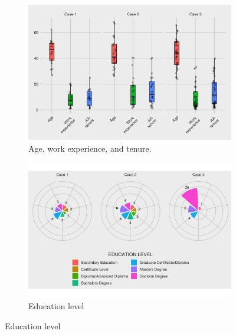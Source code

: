 \begin{figure}
\centering
\begin{subfigure}[b]{0.7\textwidth}
\includegraphics[width=1\linewidth]{Images/age_demographics.png}
\caption{Age, work experience, and tenure.}
\end{subfigure}

\begin{subfigure}[b]{0.7\textwidth}
\includegraphics[width=1\linewidth]{Images/ed_level.png}
\caption{Education level}
\end{subfigure}


\end{figure}
